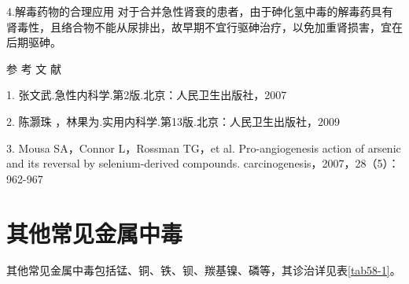 4.解毒药物的合理应用
对于合并急性肾衰的患者，由于砷化氢中毒的解毒药具有肾毒性，且络合物不能从尿排出，故早期不宜行驱砷治疗，以免加重肾损害，宜在后期驱砷。

\hypertarget{text00160.htmlux5cux23CHP5-6-4-3}{}
参 考 文 献

1. 张文武.急性内科学.第2版.北京：人民卫生出版社，2007

2. 陈灏珠 ，林果为.实用内科学.第13版.北京：人民卫生出版社，2009

3. Mousa SA，Connor L，Rossman TG，et al. Pro-angiogenesis action of
arsenic and its reversal by selenium-derived compounds.
carcinogenesis，2007，28（5）：962-967

\protect\hypertarget{text00161.html}{}{}

\section{其他常见金属中毒}

其他常见金属中毒包括锰、铜、铁、钡、羰基镍、磷等，其诊治详见表\ref{tab58-1}。

